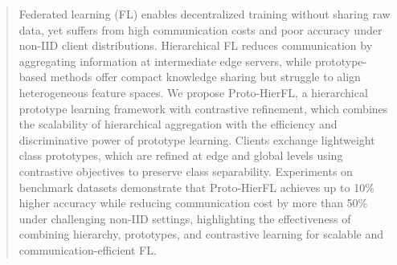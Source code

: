 \documentclass[twoside]{article}
\begin{document}
%

%


\begin{abstract}
Federated learning (FL) enables decentralized training without sharing raw data, yet suffers from high communication costs and poor accuracy under non-IID client distributions. Hierarchical FL reduces communication by aggregating information at intermediate edge servers, while prototype-based methods offer compact knowledge sharing but struggle to align heterogeneous feature spaces. We propose Proto-HierFL, a hierarchical prototype learning framework with contrastive refinement, which combines the scalability of hierarchical aggregation with the efficiency and discriminative power of prototype learning. Clients exchange lightweight class prototypes, which are refined at edge and global levels using contrastive objectives to preserve class separability. Experiments on benchmark datasets demonstrate that Proto-HierFL achieves up to 10\% higher accuracy while reducing communication cost by more than 50\% under challenging non-IID settings, highlighting the effectiveness of combining hierarchy, prototypes, and contrastive learning for scalable and communication-efficient FL.
\end{abstract}
\end{document}
